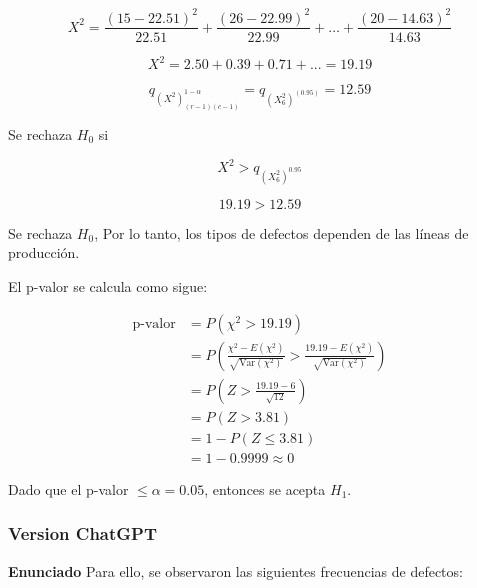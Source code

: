 \documentclass{article}
\begin{document}
\begin{equation}
    X^2 = \frac{(15-22.51)^2}{22.51} + \frac{(26-22.99)^2}{22.99} + \dots + \frac{(20-14.63)^2}{14.63}
\end{equation}

\begin{equation}
    X^2 = 2.50 + 0.39 + 0.71 + ... = 19.19
\end{equation}


\[
    q_{(X^2)_{(r-1)(c-1)}^{1-\alpha}} = q_{(X^2_6)^(0.95)} = 12.59
\]

Se rechaza $H_0$ si

\[X^2 > q_{(X^2_6)^0.95}\]

\[19.19 > 12.59\]

Se rechaza $H_0$, Por lo tanto, los tipos de defectos dependen de las líneas de producción.

El p-valor se calcula como sigue:

\begin{align*}
    \text{p-valor} & = P\left(\chi^2 > 19.19\right)                                                                                             \\
                   & = P\left(\frac{\chi^2 - E(\chi^2)}{\sqrt{\text{Var}(\chi^2)}} > \frac{19.19 - E(\chi^2)}{\sqrt{\text{Var}(\chi^2)}}\right) \\
                   & = P\left(Z > \frac{19.19 - 6}{\sqrt{12}}\right)                                                                            \\
                   & = P\left(Z > 3.81\right)                                                                                                   \\
                   & = 1 - P\left(Z \leq 3.81\right)                                                                                            \\
                   & = 1 - 0.9999 \approx 0
\end{align*}

Dado que el p-valor \( \leq \alpha = 0.05 \), entonces se acepta \( H_1 \).

\subsubsection*{Version ChatGPT}

\textbf{Enunciado}
Para ello, se observaron las siguientes frecuencias de defectos:
\end{document}
